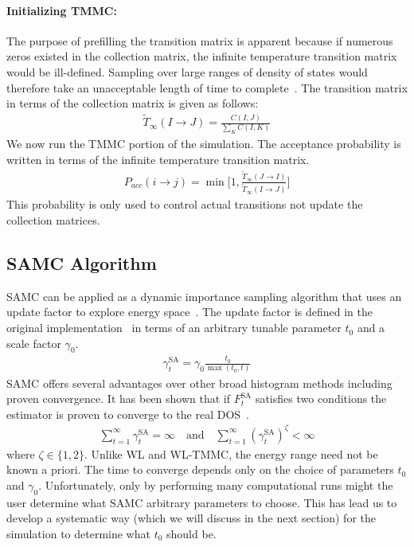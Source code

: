 \documentclass[letterpaper,twocolumn,amsmath,amssymb,pre,aps,10pt]{revtex4-1}
\begin{document}
\paragraph{Initializing TMMC:} The purpose of prefilling the transition
matrix is apparent because if numerous zeros existed in the collection
matrix, the infinite temperature transition matrix would be
ill-defined.  Sampling over large ranges of density of states would
therefore take an unacceptable length of time to
complete~\cite{shell2003improved, shen2014elucidating}.  The transition
matrix in terms of the collection matrix is given as
follows:
\begin{align}
\widetilde{T}_{\infty}(I\rightarrow J) = \frac{C(I,J)}
{\sum_{K} C(I,K)}
\end{align}
We now run the TMMC portion of the simulation.
The acceptance probability is written in terms of the infinite temperature
transition matrix.
\begin{align}
  P_{acc}(i\rightarrow j) = \min\bigg[1,\frac{\widetilde{T}_{\infty}(J\rightarrow I)}
  {\widetilde{T}_{\infty}(I\rightarrow J)}\bigg]
\end{align}
This probability is only used to control actual transitions not update
the collection matrices.

\subsection{SAMC Algorithm}
SAMC can be applied as a dynamic importance sampling algorithm that
uses an update factor to explore energy
space~\cite{liang2007stochastic, werlich2015stochastic,
schneider2017convergence}.  The update factor is defined in the
original implementation~\cite{liang2007stochastic} in terms of an
arbitrary tunable parameter $t_0$ and a scale factor $\gamma_0$.
\begin{align}
\gamma_{t}^{\text{SA}} =\gamma_0 \frac{t_0}{\max(t_0,t)}
\end{align}
SAMC offers several advantages over other broad histogram methods
including proven convergence. It has been shown that if
$F_{t}^{\text{SA}}$ satisfies two conditions the estimator is proven to
converge to the real DOS~\cite{liang2006theory, liang2007stochastic}.
\begin{align}
\sum_{t=1}^\infty \gamma_{t}^{\text{SA}} = \infty \quad\textrm{and}\quad
\sum_{t=1}^\infty (\gamma_{t}^{\text{SA}})^\zeta < \infty
\end{align}
where $\zeta \in \{1,2\}$.  Unlike WL and WL-TMMC, the energy range need
not be known a priori.  The time to converge depends only on the choice of
parameters $t_0$ and $\gamma_0$.
Unfortunately, only by performing many computational runs might the user
determine what SAMC arbitrary parameters to choose.  This has lead us
to develop a systematic way (which we will discuss in the next section)
for the simulation to determine what $t_0$ should be.
\end{document}
